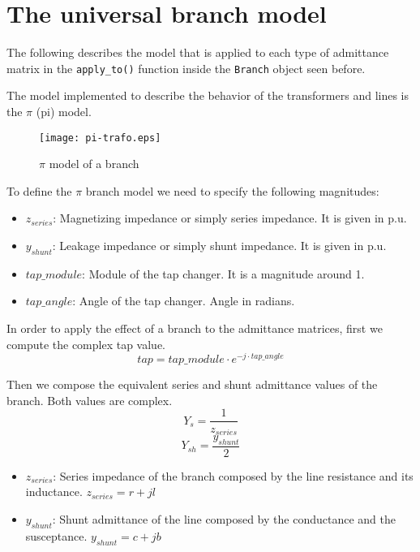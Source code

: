 \documentclass[11pt,fleqn]{book} %
\begin{document}
\section{The universal branch model}

The following describes the model that is applied to each type of admittance matrix in the \verb|apply_to()| function inside the \verb|Branch| object seen before.

The model implemented to describe the behavior of the transformers and lines is the $\pi$ (pi) model.
\begin{figure}[h]
	\centering\texttt{[image: pi-trafo.eps]}
	\caption{$\pi$ model of a branch}
	\label{trafo pi model}
\end{figure}

To define the $\pi$ branch model we need to specify the following magnitudes:

\begin{itemize}
	\item $z_{series}$: Magnetizing impedance or simply series impedance. It is given in p.u.
	\item $y_{shunt}$: Leakage impedance or simply shunt impedance. It is given in p.u.
	\item $tap\_module$: Module of the tap changer. It is a magnitude around 1.
	\item $tap\_angle$: Angle of the tap changer. Angle in radians.\newline
\end{itemize}



In order to apply the effect of a branch to the admittance matrices, first we compute the complex tap value.
$$tap = tap\_module \cdot e^{-j \cdot tap\_angle}$$  

Then we compose the equivalent series and shunt admittance values of the branch. Both values are complex.
$$Y_s = \frac{1}{z_{series}}$$
$$Y_{sh} = \frac{y_{shunt}}{2}$$

\begin{itemize}
	\item $z_{series}$: Series impedance of the branch composed by the line resistance and its inductance. $z_{series}=r + jl$
	
	\item $y_{shunt}$: Shunt admittance of the line composed by the conductance and the susceptance. $y_{shunt}=c+jb$\newline
\end{itemize}
\end{document}
